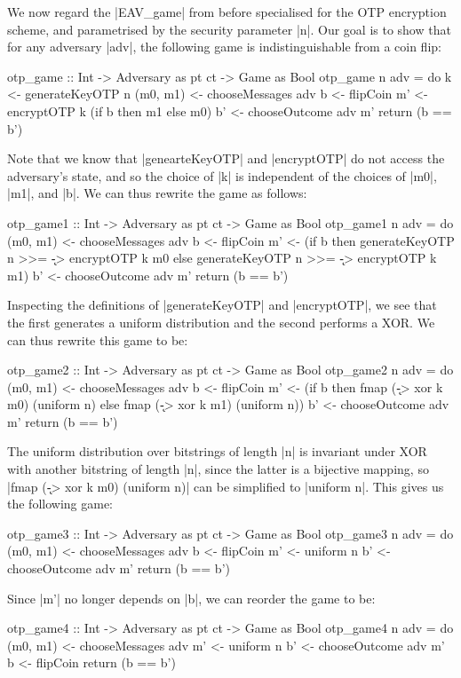 We now regard the |EAV_game| from before specialised for the OTP encryption scheme, and parametrised by the security
parameter |n|.  Our goal is to show that for any adversary |adv|, the following game is indistinguishable from a coin
flip:
\begin{code}
otp_game :: Int -> Adversary as pt ct -> Game as Bool
otp_game n adv = do
    k <- generateKeyOTP n
    (m0, m1) <- chooseMessages adv
    b <- flipCoin
    m' <- encryptOTP k (if b then m1 else m0)
    b' <- chooseOutcome adv m'
    return (b == b')
\end{code}

Note that we know that |genearteKeyOTP| and |encryptOTP| do not access the adversary's state, and so the choice of |k| is
independent of the choices of |m0|, |m1|, and |b|.  We can thus rewrite the game as follows:
\begin{code}
otp_game1 :: Int -> Adversary as pt ct -> Game as Bool
otp_game1 n adv = do
    (m0, m1) <- chooseMessages adv
    b <- flipCoin
    m' <- (if b then generateKeyOTP n >>= \k -> encryptOTP k m0
                else generateKeyOTP n >>= \k -> encryptOTP k m1)
    b' <- chooseOutcome adv m'
    return (b == b')
\end{code}

Inspecting the definitions of |generateKeyOTP| and |encryptOTP|, we see that the first generates a uniform distribution
and the second performs a XOR.  We can thus rewrite this game to be:
\begin{code}
otp_game2 :: Int -> Adversary as pt ct -> Game as Bool
otp_game2 n adv = do
    (m0, m1) <- chooseMessages adv
    b <- flipCoin
    m' <- (if b then fmap (\k -> xor k m0) (uniform n)
                else fmap (\k -> xor k m1) (uniform n))
    b' <- chooseOutcome adv m'
    return (b == b')
\end{code}

The uniform distribution over bitstrings of length |n| is invariant under XOR with another bitstring of length |n|,
since the latter is a bijective mapping, so |fmap (\k -> xor k m0) (uniform n)| can be simplified to |uniform n|.  This
gives us the following game:
\begin{code}
otp_game3 :: Int -> Adversary as pt ct -> Game as Bool
otp_game3 n adv = do
    (m0, m1) <- chooseMessages adv
    b <- flipCoin
    m' <- uniform n
    b' <- chooseOutcome adv m'
    return (b == b')
\end{code}

Since |m'| no longer depends on |b|, we can reorder the game to be:
\begin{code}
otp_game4 :: Int -> Adversary as pt ct -> Game as Bool
otp_game4 n adv = do
    (m0, m1) <- chooseMessages adv
    m' <- uniform n
    b' <- chooseOutcome adv m'
    b <- flipCoin
    return (b == b')
\end{code}

